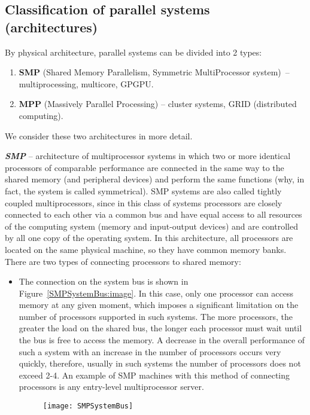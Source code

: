 { %
	\subsection{Classification of parallel systems (architectures)}
	\par By physical architecture, parallel systems can be divided into 2 types:
		\begin{enumerate}
			\item\textbf{SMP} (Shared Memory Parallelism, Symmetric MultiProcessor system)~-- multiprocessing, multicore, GPGPU. 
			\item\textbf{MPP} (Massively Parallel Processing) -- cluster systems, GRID (distributed computing).
		\end{enumerate}
	\par We consider these two architectures in more detail.
	\par\textbf{\textit{SMP}} -- architecture of multiprocessor systems in which two or more identical processors of comparable performance are connected in the same way to the shared memory (and peripheral devices) and perform the same functions (why, in fact, the system is called symmetrical). SMP systems are also called tightly coupled multiprocessors, since in this class of systems processors are closely connected to each other via a common bus and have equal access to all resources of the computing system (memory and input-output devices) and are controlled by all one copy of the operating system. In this architecture, all processors are located on the same physical machine, so they have common memory banks. There are two types of connecting processors to shared memory:
		\begin{itemize}
			\item The connection on the system bus is shown in Figure~\ref{SMPSystemBus:image}. In this case, only one processor can access memory at any given moment, which imposes a significant limitation on the number of processors supported in such systems. The more processors, the greater the load on the shared bus, the longer each processor must wait until the bus is free to access the memory. A decrease in the overall performance of such a system with an increase in the number of processors occurs very quickly, therefore, usually in such systems the number of processors does not exceed 2-4. An example of SMP machines with this method of connecting processors is any entry-level multiprocessor server.
				\begin{figure}[H]
					\texttt{[image: SMPSystemBus]}

\end{figure}
\end{itemize}}
